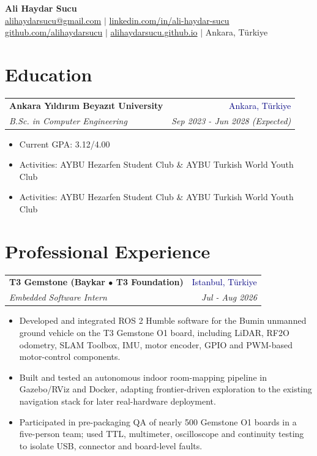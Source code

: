 \documentclass[10pt,letterpaper]{article}
\makeatletter
\newcommand{\entry}[4]{%
  \begin{tabularx}{\textwidth}{@{}Xr@{}}
    \textbf{#1} & \textcolor{navy}{#2}\\
    \textit{#3} & \textit{#4}
  \end{tabularx}\vspace{1pt}}
\makeatother
\begin{document}
\begin{center}
  {\LARGE\bfseries Ali Haydar Sucu}\\[3pt]
  \small
  \href{mailto:alihaydarsucu@gmail.com}{alihaydarsucu@gmail.com} $\mid$
  \href{https://linkedin.com/in/ali-haydar-sucu}{linkedin.com/in/ali-haydar-sucu}\\
  \href{https://github.com/alihaydarsucu}{github.com/alihaydarsucu} $\mid$
  \href{https://alihaydarsucu.github.io/}{alihaydarsucu.github.io} $\mid$ Ankara, Türkiye
\end{center}

\section{Education}
\entry{Ankara Yıldırım Beyazıt University}{Ankara, Türkiye}
      {B.Sc. in Computer Engineering}{Sep 2023 - Jun 2028 (Expected)}
\begin{itemize}
  \item Current GPA: 3.12/4.00
  \ifdefined\norocket
    \item Activities: AYBU Hezarfen Student Club \& AYBU Turkish World Youth Club
  \else
    \item Activities: AYBU Hezarfen Student Club \& AYBU Turkish World Youth Club
  \fi
\end{itemize}

\section{Professional Experience}
\entry{T3 Gemstone (Baykar $\bullet$ T3 Foundation)}{Istanbul, Türkiye}
      {Embedded Software Intern}{Jul - Aug 2026}
\begin{itemize}
  \item Developed and integrated ROS 2 Humble software for the Bumin unmanned ground vehicle on the T3 Gemstone O1 board, including LiDAR, RF2O odometry, SLAM Toolbox, IMU, motor encoder, GPIO and PWM-based motor-control components.
  \item Built and tested an autonomous indoor room-mapping pipeline in Gazebo/RViz and Docker, adapting frontier-driven exploration to the existing navigation stack for later real-hardware deployment.
  \item Participated in pre-packaging QA of nearly 500 Gemstone O1 boards in a five-person team; used TTL, multimeter, oscilloscope and continuity testing to isolate USB, connector and board-level faults.
\end{itemize}
\vspace{2pt}
\end{document}
